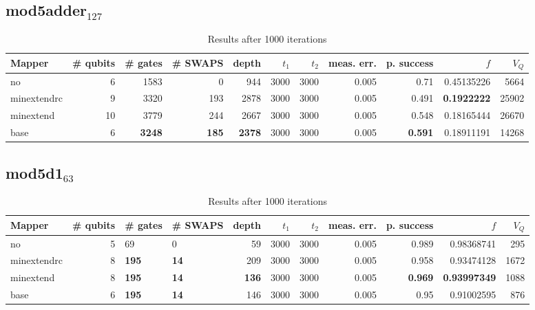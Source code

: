 \documentclass[11pt]{article}
\begin{document}
\subsection{mod5adder\(_{\text{127}}\)}
\label{sec:org821ee74}
\begin{table}[H]
\caption{\label{tab:org75c98ba}
Results after 1000 iterations}
\centering
\small
\begin{tabular}{lrrrrrrrrrr}
\hline
Mapper & \# qubits & \# gates & \# SWAPS & depth & \(t_1\) & \(t_2\) & meas. err. & p. success & \(f\) & \(V_Q\)\\
\hline
no & 6 & 1583 & 0 & 944 & 3000 & 3000 & 0.005 & 0.71 & 0.45135226 & 5664\\
\hline
minextendrc & 9 & 3320 & 193 & 2878 & 3000 & 3000 & 0.005 & 0.491 & \textbf{0.1922222} & 25902\\
minextend & 10 & 3779 & 244 & 2667 & 3000 & 3000 & 0.005 & 0.548 & 0.18165444 & 26670\\
base & 6 & \textbf{3248} & \textbf{185} & \textbf{2378} & 3000 & 3000 & 0.005 & \textbf{0.591} & 0.18911191 & 14268\\
\hline
\end{tabular}
\end{table}
\subsection{mod5d1\(_{\text{63}}\)}
\label{sec:org18f5f18}
\begin{table}[H]
\caption{\label{tab:orga714d68}
Results after 1000 iterations}
\centering
\small
\begin{tabular}{lrllrrrrrrr}
\hline
Mapper & \# qubits & \# gates & \# SWAPS & depth & \(t_1\) & \(t_2\) & meas. err. & p. success & \(f\) & \(V_Q\)\\
\hline
no & 5 & 69 & 0 & 59 & 3000 & 3000 & 0.005 & 0.989 & 0.98368741 & 295\\
\hline
minextendrc & 8 & \textbf{195} & \textbf{14} & 209 & 3000 & 3000 & 0.005 & 0.958 & 0.93474128 & 1672\\
minextend & 8 & \textbf{195} & \textbf{14} & \textbf{136} & 3000 & 3000 & 0.005 & \textbf{0.969} & \textbf{0.93997349} & 1088\\
base & 6 & \textbf{195} & \textbf{14} & 146 & 3000 & 3000 & 0.005 & 0.95 & 0.91002595 & 876\\
\hline
\end{tabular}
\end{table}
\end{document}
